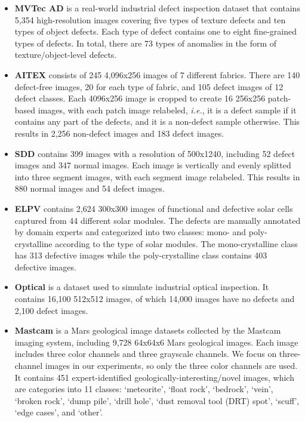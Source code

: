 \documentclass[10pt,journal,compsoc]{IEEEtran}
\newcommand{\ie}{\textit{i.e.}}
\begin{document}
\begin{itemize}
    \item \textbf{MVTec AD} \cite{bergmann2019mvtec} is a real-world industrial defect inspection dataset that contains 5,354 high-resolution images covering five types of texture defects and ten types of object defects. Each type of defect contains one to eight fine-grained types of defects. In total, there are 73 types of anomalies in the form of texture/object-level defects.
    \item \textbf{AITEX} \cite{silvestre2019public} consists of 245 4,096x256 images of 7 different fabrics. There are 140 defect-free images, 20 for each type of fabric, and 105 defect images of 12 defect classes. Each 4096x256 image is cropped to create 16 256x256 patch-based images, with each patch image relabeled, \ie, it is a defect sample if it contains any part of the defects, and it is a non-defect sample otherwise. This results in 2,256 non-defect images and 183 defect images.
    \item \textbf{SDD} \cite{Tabernik2019JIM} contains 399 images with a resolution of 500x1240, including 52 defect images and 347 normal images. Each image is vertically and evenly splitted into three segment images, with each segment image relabeled. This results in 880 normal images and 54 defect images.
    
    \item \textbf{ELPV} \cite{deitsch2019elpv} contains 2,624 300x300 images of functional and defective solar cells captured from 44 different solar modules. The defects are manually annotated by domain experts and categorized into two classes: mono- and poly-crystalline according to the type of solar modules. The mono-crystalline class has 313 defective images while the poly-crystalline class contains 403 defective images.

    \item \textbf{Optical} \cite{wieler2007weakly} is a dataset used to simulate industrial optical inspection. It contains 16,100 512x512 images, of which 
    14,000 images have no defects and 2,100 defect images. 

    \item \textbf{Mastcam} \cite{kerner2020comparison} is a Mars geological image datasets collected by the Mastcam imaging system, including 9,728 64x64x6 Mars geological images. Each image includes three color channels and three grayscale channels. We focus on three-channel images in our experiments, so only the three color channels are used. It contains 451 expert-identified geologically-interesting/novel images, which are categories into 11 classes: `meteorite', `float rock', `bedrock', `vein', `broken rock', `dump pile', `drill hole', `dust removal tool (DRT) spot', `scuff', `edge cases', and `other'. 


\end{itemize}
\end{document}
